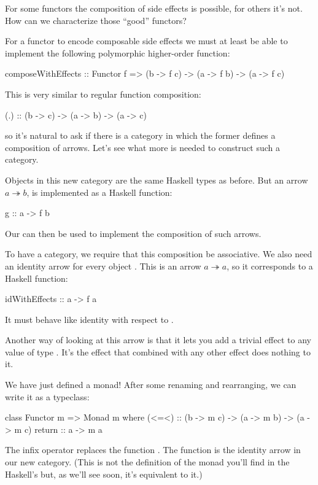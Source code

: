 \documentclass[DaoFP]{subfiles}
\begin{document}
For some functors the composition of side effects is possible, for others it's not. How can we characterize those ``good'' functors?

For a functor to encode composable side effects we must at least be able to implement the following polymorphic higher-order function: 
\begin{haskell}
composeWithEffects :: Functor f => 
       (b -> f c) -> (a -> f b) -> (a -> f c)
\end{haskell}
This is very similar to regular function composition:
\begin{haskell}
(.) :: (b -> c) -> (a -> b) -> (a -> c)
\end{haskell}
so it's natural to ask if there is a category in which the former defines a composition of arrows. Let's see what more is needed to construct such a category.

Objects in this new category are the same Haskell types as before. But an arrow $a \twoheadrightarrow b$, is implemented as a Haskell function:
\begin{haskell}
g :: a -> f b
\end{haskell}
Our  can then be used to implement the composition of such arrows. 

To have a category, we require that this composition be associative. We also need an identity arrow for every object . This is an arrow $a \twoheadrightarrow a$, so it corresponds to a Haskell function:
\begin{haskell}
idWithEffects :: a -> f a
\end{haskell}
It must behave like identity with respect to .

Another way of looking at this arrow is that it lets you add a trivial effect to any value of type . It's the effect that combined with any other effect does nothing to it.

We have just defined a monad! After some renaming and rearranging, we can write it as a typeclass:
\begin{haskell}
class Functor m => Monad m where
  (<=<) :: (b -> m c) -> (a -> m b) -> (a -> m c)
  return :: a -> m a
\end{haskell}
The infix operator \hask{<=<} replaces the function . The  function is the identity arrow in our new category. (This is not the definition of the monad you'll find in the Haskell's  but, as we'll see soon, it's equivalent to it.)
\end{document}
